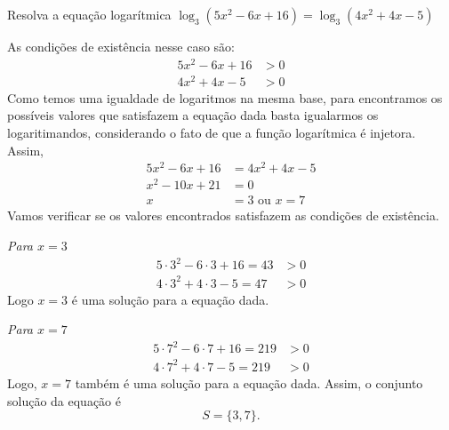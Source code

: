 \begin{example}
  Resolva a equação logarítmica
  \(
    \log_3 \left( 5x^2 - 6x + 16 \right)
    = \log_3 \left( 4x^2 + 4x - 5 \right)
  \)

  \solution
  As condições de existência nesse caso são:
  \begin{align*}
    5x^2 - 6x + 16 & > 0 \\
    4x^2 + 4x -  5 & > 0
  \end{align*}
  Como temos uma igualdade de logaritmos na mesma base, para
  encontramos os possíveis valores que satisfazem a equação dada
  basta igualarmos os logaritimandos, considerando o fato de que a
  função logarítmica é injetora. Assim,
  \begin{align*}
    5x^2 - 6x + 16 & = 4x^2 + 4x - 5 \\
    x^2 - 10x + 21 & = 0             \\
    x              & = 3 \text{ ou } x = 7
  \end{align*}
  Vamos verificar se os valores encontrados satisfazem as condições
  de existência.

  \emph{Para $x=3$}
  \begin{align*}
    5 \cdot 3^2 - 6 \cdot 3+16 = 43 & > 0 \\
    4 \cdot 3^2 + 4 \cdot 3- 5 = 47 & > 0
  \end{align*}
  Logo $x=3$ é uma solução para a equação dada.

  \emph{Para $x=7$}
  \begin{align*}
    5 \cdot 7^2 - 6 \cdot 7 + 16 = 219 & > 0 \\
    4 \cdot 7^2 + 4 \cdot 7 -  5 = 219 & > 0
  \end{align*}
  Logo, $x=7$ também é uma solução para a equação dada. Assim, o conjunto
  solução da equação é
  \[
    S = \{3, 7\}.
  \]
\end{example}
